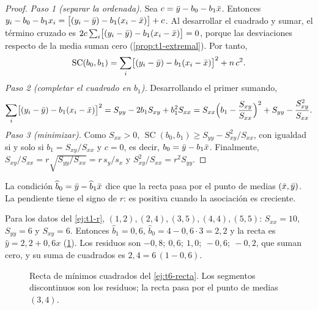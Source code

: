\begin{proof}
\emph{Paso 1 (separar la ordenada).} Sea $c=\bar{y}-b_0-b_1\bar{x}$. Entonces $y_i-b_0-b_1x_i=\bigl[(y_i-\bar{y})-b_1(x_i-\bar{x})\bigr]+c$. Al desarrollar el cuadrado y sumar, el término cruzado es $2c\sum_i\bigl[(y_i-\bar{y})-b_1(x_i-\bar{x})\bigr]=0$, porque las desviaciones respecto de la media suman cero (\cref{prop:t1-extremal}). Por tanto,
\[
\operatorname{SC}(b_0,b_1)=\sum_{i}\bigl[(y_i-\bar{y})-b_1(x_i-\bar{x})\bigr]^{2}+n\,c^{2}.
\]
\emph{Paso 2 (completar el cuadrado en $b_1$).} Desarrollando el primer sumando,
\[
\sum_i\bigl[(y_i-\bar{y})-b_1(x_i-\bar{x})\bigr]^{2}=S_{yy}-2b_1S_{xy}+b_1^{2}S_{xx}=S_{xx}\Bigl(b_1-\frac{S_{xy}}{S_{xx}}\Bigr)^{2}+S_{yy}-\frac{S_{xy}^{2}}{S_{xx}}.
\]
\emph{Paso 3 (minimizar).} Como $S_{xx}>0$, $\operatorname{SC}(b_0,b_1)\ge S_{yy}-S_{xy}^{2}/S_{xx}$, con igualdad si y solo si $b_1=S_{xy}/S_{xx}$ y $c=0$, es decir, $b_0=\bar{y}-b_1\bar{x}$. Finalmente, $S_{xy}/S_{xx}=r\sqrt{S_{yy}/S_{xx}}=r\,s_y/s_x$ y $S_{xy}^{2}/S_{xx}=r^{2}S_{yy}$.
\end{proof}

La condición $\widehat b_0=\bar{y}-\widehat b_1\bar{x}$ dice que la recta pasa por el punto de medias $(\bar{x},\bar{y})$. La pendiente tiene el signo de $r$: es positiva cuando la asociación es creciente.

\begin{ejemplo}\label{ej:t6-recta}
Para los datos del \cref{ej:t1-r}, $(1,2),(2,4),(3,5),(4,4),(5,5)$: $S_{xx}=10$, $S_{yy}=6$ y $S_{xy}=6$. Entonces $\widehat b_1=0{,}6$, $\widehat b_0=4-0{,}6\cdot3=2{,}2$ y la recta es $\widehat y=2{,}2+0{,}6x$ (\cref{fig:t6-recta}). Los residuos son $-0{,}8;\allowbreak\ 0{,}6;\allowbreak\ 1{,}0;\allowbreak\ -0{,}6;\allowbreak\ -0{,}2$, que suman cero, y su suma de cuadrados es $2{,}4=6\,(1-0{,}6)$.
\end{ejemplo}

\begin{figure}[ht]
\centering
{}
\caption{Recta de mínimos cuadrados del \cref{ej:t6-recta}. Los segmentos discontinuos son los residuos; la recta pasa por el punto de medias $(3,4)$.}\label{fig:t6-recta}
\end{figure}


